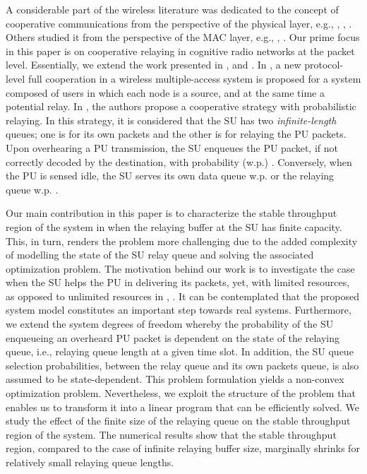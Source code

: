 \documentclass[conference]{IEEEtran}
\begin{document}
A considerable part of the wireless literature was dedicated to the
concept of cooperative communications from the perspective of the
physical layer, e.g., \cite{Tse}, \cite{Kramer}, \cite{Gamal}. Others
studied it from the perspective of the MAC layer, e.g., \cite{Sadek},
\cite{Krikidis}. Our prime focus in this paper is on cooperative
relaying in cognitive radio networks at the packet level.
Essentially, we extend the work presented in
\cite{R_CoopAcc}, \cite{Ashour_Conf} and \cite{Ashour_Journal}. In
\cite{R_CoopAcc}, a new protocol-level full cooperation in a wireless
multiple-access system is proposed for a system composed of 
users in which each node is a source, and at the same
time a potential relay. 
In \cite{Ashour_Conf,Ashour_Journal}, the authors propose a 
cooperative strategy with probabilistic relaying. In this
strategy, it is considered that the SU has two
\emph{infinite-length} queues; one is for its own packets and the
other is for relaying the PU packets. Upon overhearing a PU transmission, 
the SU enqueues the PU packet, if not correctly decoded by the destination, 
with probability (w.p.) . Conversely, when the PU
is sensed idle, the SU serves its own data queue w.p.  or the
relaying queue w.p. .

Our main contribution in this paper is to characterize the stable throughput 
region of the system in \cite{Ashour_Journal} when the relaying buffer at the SU
has finite capacity. This, in turn, renders the problem more 
challenging due to the added complexity of modelling the state 
of the SU relay queue and solving the associated optimization problem. 
The motivation behind our work is to 
investigate the case when the SU helps the PU in
delivering its packets, yet, with limited resources, as opposed to
unlimited resources in \cite{R_CoopAcc}, \cite{Ashour_Journal}. It
can be contemplated that the proposed system model constitutes an important 
step towards real systems. Furthermore, we extend the system degrees of
freedom whereby the probability of the SU enqueueing an overheard 
PU packet is dependent on the state of the relaying queue, i.e., 
relaying queue length at a given time slot. In addition, 
the SU queue selection probabilities, between the relay queue and 
its own packets queue, is also assumed to be state-dependent.
This problem formulation yields
a non-convex optimization problem. Nevertheless, we exploit the
structure of the problem that enables us to transform it into a
linear program that can be efficiently solved. We study
the effect of the finite size of the relaying queue on the stable
throughput region of the system. The numerical results show that 
the stable throughput region, compared to the case of
infinite relaying buffer size, marginally shrinks for
relatively small relaying queue lengths.
\end{document}
